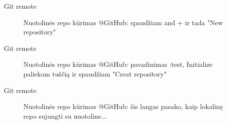 \documentclass[11pt,xcolor=table]{beamer}
\begin{document}
\begin{frame}{Git remote}
\begin{figure}
\caption{Nuotolinės repo kūrimas @GitHub: spaudžiam and + ir tada "New repository"}
\end{figure}
\end{frame}

\begin{frame}{Git remote}
\begin{figure}
\caption{Nuotolinės repo kūrimas @GitHub: pavadinimas :test, Initialize paliekam tuščią ir spaudžiam "Creat repository"}
\end{figure}
\end{frame}


\begin{frame}{Git remote}
\begin{figure}
\caption{Nuotolinės repo kūrimas @GitHub: šis langas pasako, kaip lokalinę repo sujungti su nuotoline...}
\end{figure}
\end{frame}
\end{document}
